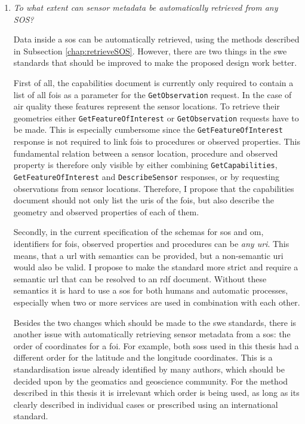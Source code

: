 \begin{enumerate}
\item \textit{To what extent can sensor metadata be automatically retrieved from any SOS?}%

Data inside a \ac{sos} can be automatically retrieved, using the methods described in Subsection \ref{chap:retrieveSOS}. However, there are two things in the \ac{swe} standards that should be improved to make the proposed design work better. 

\begin{sloppypar}
	First of all, the capabilities document is currently only required to contain a list of all \acp{foi} as a parameter for the \texttt{GetObservation} request. In the case of air quality these features represent the sensor locations. To retrieve their geometries either \texttt{GetFeatureOfInterest} or \texttt{GetObservation} requests have to be made. This is especially cumbersome since the \texttt{GetFeatureOfInterest} response is not required to link \acp{foi} to procedures or observed properties. This fundamental relation between a sensor location, procedure and observed property is therefore only visible by either combining \texttt{GetCapabilities}, \texttt{GetFeatureOfInterest} and \texttt{DescribeSensor} responses, or by requesting observations from sensor locations. Therefore, I propose that the capabilities document should not only list the \acp{uri} of the \acp{foi}, but also describe the geometry and observed properties of each of them. 
\end{sloppypar}

Secondly, in the current specification of the  schemas for \ac{sos} and \ac{om}, identifiers for \acp{foi}, observed properties and procedures can be \textit{any \ac{uri}}. This means, that a \ac{url} with semantics can be provided, but a non-semantic \ac{uri} would also be valid. I propose to make the standard more strict and require a semantic \ac{url} that can be resolved to an \ac{rdf} document. Without these semantics it is hard to use a \ac{sos} for both humans and automatic processes, especially when two or more services are used in combination with each other. 

Besides the two changes which should be made to the \ac{swe} standards, there is another issue with automatically retrieving sensor metadata from a \ac{sos}: the order of coordinates for a \ac{foi}. For example, both \aclp{sos} used in this thesis had a different order for the latitude and the longitude coordinates. This is a standardisation issue already identified by many authors, which should be decided upon by the geomatics and geoscience community. For the method described in this thesis it is irrelevant which order is being used, as long as its clearly described in individual cases or prescribed using an international standard.


\end{enumerate}
